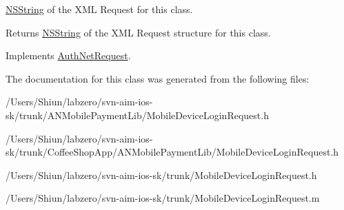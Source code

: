 \hyperlink{class_n_s_string}{NSString} of the XML Request for this class. 

\begin{DoxyReturn}{Returns}
\hyperlink{class_n_s_string}{NSString} of the XML Request structure for this class. 
\end{DoxyReturn}


Implements \hyperlink{interface_auth_net_request_aab99d065f49b7ed086b041c1c70e2975}{AuthNetRequest}.



The documentation for this class was generated from the following files:\begin{DoxyCompactItemize}
\item 
/Users/Shiun/labzero/svn-\/aim-\/ios-\/sk/trunk/ANMobilePaymentLib/MobileDeviceLoginRequest.h\item 
/Users/Shiun/labzero/svn-\/aim-\/ios-\/sk/trunk/CoffeeShopApp/ANMobilePaymentLib/MobileDeviceLoginRequest.h\item 
/Users/Shiun/labzero/svn-\/aim-\/ios-\/sk/trunk/MobileDeviceLoginRequest.h\item 
/Users/Shiun/labzero/svn-\/aim-\/ios-\/sk/trunk/MobileDeviceLoginRequest.m\end{DoxyCompactItemize}

